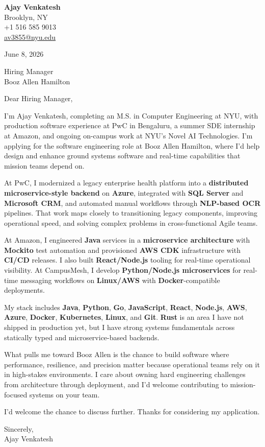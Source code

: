 \documentclass[letterpaper,11pt]{article}
\begin{document}
\begin{flushleft}
\textbf{\large Ajay Venkatesh} \\
Brooklyn, NY \\
+1 516 585 9013 \\
\href{mailto:av3855@nyu.edu}{av3855@nyu.edu}
\end{flushleft}
\vspace{10pt}
June 8, 2026
\vspace{6pt}

Hiring Manager \\
Booz Allen Hamilton

\vspace{10pt}

Dear Hiring Manager,

I'm Ajay Venkatesh, completing an M.S. in Computer Engineering at NYU, with production software experience at PwC in Bengaluru, a summer SDE internship at Amazon, and ongoing on-campus work at NYU's Novel AI Technologies. I'm applying for the software engineering role at Booz Allen Hamilton, where I'd help design and enhance ground systems software and real-time capabilities that mission teams depend on.

At PwC, I modernized a legacy enterprise health platform into a \textbf{distributed microservice-style backend} on \textbf{Azure}, integrated with \textbf{SQL Server} and \textbf{Microsoft CRM}, and automated manual workflows through \textbf{NLP-based OCR} pipelines. That work maps closely to transitioning legacy components, improving operational speed, and solving complex problems in cross-functional Agile teams.

At Amazon, I engineered \textbf{Java} services in a \textbf{microservice architecture} with \textbf{Mockito} test automation and provisioned \textbf{AWS CDK} infrastructure with \textbf{CI/CD} releases. I also built \textbf{React/Node.js} tooling for real-time operational visibility. At CampusMesh, I develop \textbf{Python/Node.js microservices} for real-time messaging workflows on \textbf{Linux/AWS} with \textbf{Docker}-compatible deployments.

My stack includes \textbf{Java}, \textbf{Python}, \textbf{Go}, \textbf{JavaScript}, \textbf{React}, \textbf{Node.js}, \textbf{AWS}, \textbf{Azure}, \textbf{Docker}, \textbf{Kubernetes}, \textbf{Linux}, and \textbf{Git}. \textbf{Rust} is an area I have not shipped in production yet, but I have strong systems fundamentals across statically typed and microservice-based backends.

What pulls me toward Booz Allen is the chance to build software where performance, resilience, and precision matter because operational teams rely on it in high-stakes environments. I care about owning hard engineering challenges from architecture through deployment, and I'd welcome contributing to mission-focused systems on your team.

I'd welcome the chance to discuss further. Thanks for considering my application.

\vspace{12pt}
Sincerely, \\
Ajay Venkatesh
\end{document}
